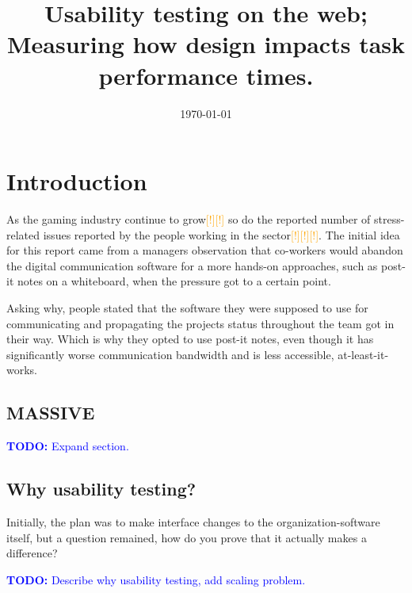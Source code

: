 \documentclass[nofilelist,dvipsnames]{cslthse-msc}
\title{
  Usability testing on the web; Measuring how design impacts task performance
  times.
}
\date{\today}
\begin{document}
\renewcommand{\bibname}{References}

\makefrontmatter
\newcommand{\todo}[1]{\textcolor{blue}{\textbf{TODO:} #1}}
\newcommand{\todoMaybe}[1]{\textcolor{OliveGreen}{\textbf{?TODO:} #1?}}
\newcommand{\eatdot}[1]{}
\newcommand{\ctitle}[1]{\citetitle{#1}\cite{#1}}
\newcommand{\varHere}[1]{\unskip}
\newcommand{\checkTruth}[0]{\textcolor{red}{(?)} }
\newcommand{\findref}[0]{\textcolor{orange}{[!]}}%

\chapter{Introduction}

  As the gaming industry continue to grow{\findref\findref} so do the reported
  number of stress-related issues reported by the people working in the
  sector{\findref\findref\findref}. The initial idea for this report came from a managers
  observation that co-workers would abandon the digital communication software
  for a more hands-on approaches, such as post-it notes on a whiteboard, when
  the pressure got to a certain point.

  Asking why, people stated that the software they were supposed to use for
  communicating and propagating the projects status throughout the team got in
  their way. Which is why they opted to use post-it notes, even though it has
  significantly worse communication bandwidth and is less accessible,
  at-least-it-works\texttrademark.

  \section[MASSIVE Entertainment | A Ubisoft studio]{MASSIVE}

  {}

    \todo{Expand section.}

  \section{Why usability testing?}

    Initially, the plan was to make interface changes to the organization-software
    itself, but a question remained, how do you prove that it actually makes a
    difference?

    \todo{Describe why usability testing, add scaling problem.}
\end{document}
